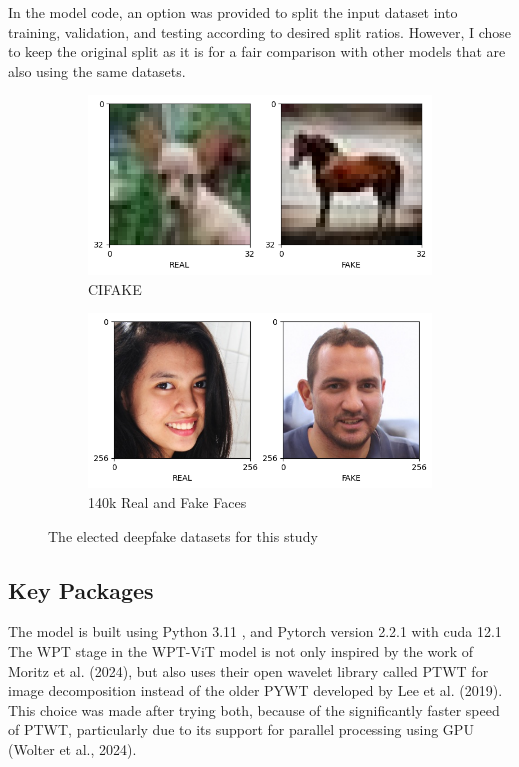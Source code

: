 \documentclass{svproc}
\begin{document}
In the model code, an option was provided to split the input dataset into
training, validation, and testing according to desired split ratios. However, I
chose to keep the original split as it is for a fair comparison with other
models that are also using the same datasets.



\begin{figure}[H]
  \centering
  \begin{subfigure}{.5\textwidth}
    \centering
    \includegraphics[width=0.9\linewidth]{figures/dataset_CIFAKE.png}
    \caption{CIFAKE}
    \label{fig:sub1}
  \end{subfigure}%
  \begin{subfigure}{.5\textwidth}
    \centering
    \includegraphics[width=0.9\linewidth]{figures/dataset_RVSF.png}
    \caption{140k Real and Fake Faces}
    \label{fig:sub2}
  \end{subfigure}
  \caption{The elected deepfake datasets for this study}
  \label{fig:test}
\end{figure}

\subsection{Key Packages}
The model is built using Python 3.11 , and Pytorch version 2.2.1 with cuda 12.1
The WPT stage in the WPT-ViT model is not only inspired by the work of Moritz
et al. (2024), but also uses their open wavelet library called PTWT for image
decomposition instead of the older PYWT developed by Lee et al. (2019). This
choice was made after trying both, because of the significantly faster speed of
PTWT, particularly due to its support for parallel processing using GPU (Wolter
et al., 2024).
\end{document}
